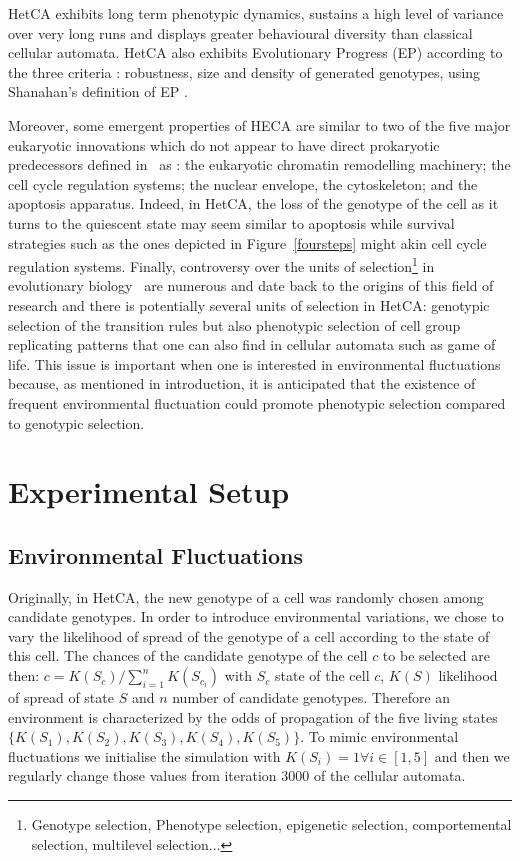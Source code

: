 \documentclass[letterpaper]{article}
\begin{document}
HetCA exhibits long term phenotypic dynamics, sustains a high level of variance over very long runs and displays greater behavioural diversity than classical cellular automata\citep{medernach2013long}. HetCA also exhibits Evolutionary Progress (EP) according to the three criteria : robustness, size and density of generated genotypes\citep{medernach2015evolutionary}, using Shanahan's definition of EP \citep{shanahan2012evolutionary}.

Moreover, some emergent properties of HECA are similar to two of the five major eukaryotic innovations which do not appear to have direct prokaryotic predecessors defined in~\citep{smith1997major} as : the eukaryotic chromatin remodelling machinery; the cell cycle regulation systems; the nuclear envelope, the cytoskeleton; and the apoptosis apparatus\citep{koonin2002origin}. Indeed, in HetCA, the loss of the genotype of the cell as it turns to the quiescent state may seem similar to apoptosis while survival strategies such as the ones depicted in Figure~\ref{foursteps} might akin cell cycle regulation systems.
Finally, controversy over the units of selection\footnote{Genotype selection, Phenotype selection, epigenetic selection, comportemental selection, multilevel selection...} in evolutionary biology~\citep{okasha2006evolution} are numerous and date back to the origins of this field of research and there is potentially several units of selection in HetCA: genotypic selection of the transition rules but also phenotypic selection of cell group replicating patterns that one can also find in cellular automata such as game of life.  This issue is important when one is interested in environmental fluctuations because, as mentioned in introduction, it is anticipated that the existence of frequent environmental fluctuation could promote phenotypic selection compared to genotypic selection.


\section{Experimental Setup}\label{sec:exsetup}
\subsection{Environmental Fluctuations}
Originally, in HetCA, the new genotype of a cell was randomly chosen among candidate genotypes. In order to introduce environmental variations, we chose to vary the likelihood of spread of the genotype of a cell according to the state of this cell. The chances of the candidate genotype of the cell $c$ to be selected are then: $c=K(S_c)/\sum_{i=1}^{n} K(S_{c_i})$ with $S_c$ state of the cell $c$, $K(S)$ likelihood of spread of state $S$ and $n$ number of candidate genotypes. Therefore an environment is characterized by the odds of propagation of the five living states $\{K(S_1),K(S_2),K(S_3),K(S_4),K(S_5)\}$.   
To mimic environmental fluctuations we initialise the simulation with $K(S_i)=1  \forall i \in [1,5]$ and then we regularly change those values from iteration 3000 of the cellular automata. 
\end{document}
